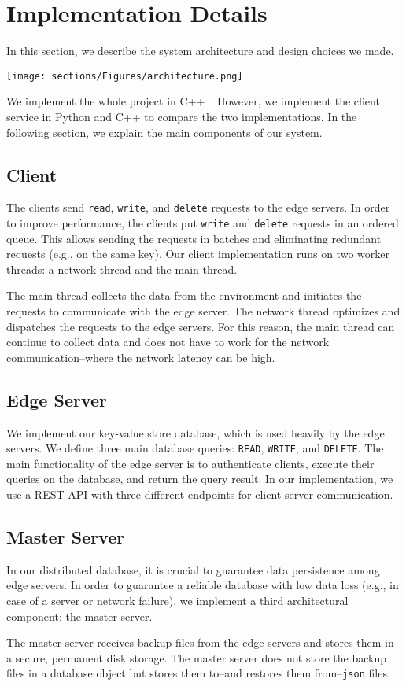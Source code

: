 \section{Implementation Details}
\label{sec:Solution}
In this section, we describe the system architecture and design choices we made. 

\begin{center}
 \texttt{[image: sections/Figures/architecture.png]}
\end{center}

We implement the whole project in C++~\cite{prj_git}. However, we implement the client service in Python and C++ to compare the two implementations. In the following section, we explain the main components of our system. 
\subsection{Client}
The clients send \texttt{read}, \texttt{write}, and \texttt{delete} requests to the edge servers. In order to improve performance, the clients put \texttt{write} and \texttt{delete} requests in an ordered queue. This allows sending the requests in batches and eliminating redundant requests (e.g., on the same key). Our client implementation runs on two worker threads: a network thread and the main thread.

The main thread collects the data from the environment and initiates the requests to communicate with the edge server. The network thread optimizes and dispatches the requests to the edge servers. For this reason, the main thread can continue to collect data and does not have to work for the network communication--where the network latency can be high.

\subsection{Edge Server}
We implement our key-value store database, which is used heavily by the edge servers. We define three main database queries: \texttt{READ}, \texttt{WRITE}, and \texttt{DELETE}. The main functionality of the edge server is to authenticate clients, execute their queries on the database, and return the query result. In our implementation, we use a REST API with three different endpoints for client-server communication.


\subsection{Master Server}
In our distributed database, it is crucial to guarantee data persistence among edge servers. In order to guarantee a reliable database with low data loss (e.g., in case of a server or network failure), we implement a third architectural component: the master server.

The master server receives backup files from the edge servers and stores them in a secure, permanent disk storage. The master server does not store the backup files in a database object but stores them to--and restores them from--\texttt{json} files.
